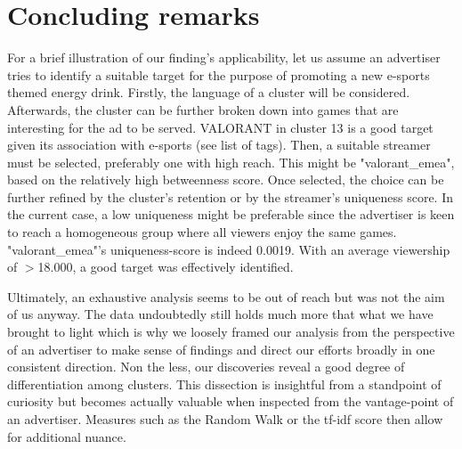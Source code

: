 \documentclass[11pt, oneside]{article}   	%
\begin{document}
\section{Concluding remarks}
For a brief illustration of our finding's applicability, let us assume an advertiser tries to identify a suitable target for the purpose of promoting a new e-sports themed energy drink. Firstly, the language of a cluster will be considered. Afterwards, the cluster can be further broken down into games that are interesting for the ad to be served. VALORANT in cluster 13 is a good target given its association with e-sports (see list of tags). Then, a suitable streamer must be selected, preferably one with high reach. This might be "valorant\_emea", based on the relatively high betweenness score. Once selected, the choice can be further refined by the cluster's retention or by the streamer's uniqueness score. In the current case, a low uniqueness might be preferable since the advertiser is keen to reach a homogeneous group where all viewers enjoy the same games. "valorant\_emea"'s uniqueness-score is indeed 0.0019. With an average viewership of $>$18.000, a good target was effectively identified.
\newline

Ultimately, an exhaustive analysis seems to be out of reach but was not the aim of us anyway. The data undoubtedly still holds much more that what we have brought to light which is why we loosely framed our analysis from the perspective of an advertiser to make sense of findings and direct our efforts broadly in one consistent direction. Non the less, our discoveries reveal a good degree of differentiation among clusters. This dissection is insightful from a standpoint of curiosity but becomes actually valuable when inspected from the vantage-point of an advertiser.
Measures such as the Random Walk or the tf-idf score then allow for additional nuance.
\end{document}
